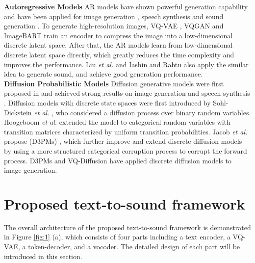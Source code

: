 \documentclass[lettersize,journal]{IEEEtran}
\begin{document}
 \noindent  \textbf{Autoregressive Models} AR models \cite{brown2020language,radford2018improving} have shown powerful generation capability and have been applied for image generation \cite{esser2021taming,ding2021cogview,van2017neural,parmar2018image,razavi2019generating,ramesh2021zero,AdityaRamesh2022HierarchicalTI}, speech synthesis \cite{wang2017tacotron} and sound generation \cite{liu2021conditional,iashin2021taming}. To generate high-resolution images, VQ-VAE \cite{van2017neural,razavi2019generating}, VQGAN \cite{esser2021taming} and ImageBART \cite{esser2021imagebart}
train an encoder to compress the image into a low-dimensional discrete latent space. After that, the AR models learn from low-dimensional discrete latent space directly, which greatly reduces the time complexity and improves the performance. Liu \textit{et al.} \cite{liu2021conditional} and Iashin and Rahtu \cite{iashin2021taming} also apply the similar idea to generate sound, and achieve good generation performance. \\
\noindent \textbf{Diffusion Probabilistic Models}
Diffusion generative models were first proposed in \cite{sohl2015deep} and achieved strong results on image generation \cite{dhariwal2021diffusion,gu2021vector,nichol2021glide,esser2021imagebart} and speech synthesis \cite{kong2020diffwave,jeong2021diff,popov2021grad,lee2021priorgrad}.
Diffusion models with discrete state spaces were first introduced by Sohl-Dickstein \textit{et al.} \cite{sohl2015deep}, who considered a diffusion process over binary random variables. Hoogeboom \textit{et al.} \cite{hoogeboom2021argmax} extended the model to categorical random variables with transition matrices characterized by uniform transition probabilities. Jacob \textit{et al.} propose {\color{black}{Discrete Denoising Diffusion Probabilistic Models}} (D3PMs) \cite{austin2021structured}, which further improve and extend discrete diffusion models by using a more structured categorical corruption process to corrupt the forward process. D3PMs \cite{austin2021structured} and VQ-Diffusion \cite{gu2021vector} have applied discrete diffusion models to image generation.


\section{Proposed text-to-sound framework} \label{AR sound generation model}
The overall architecture of the proposed text-to-sound framework is demonstrated in Figure \ref{fig:1} (a), which consists of four parts including a text encoder, a VQ-VAE, a token-decoder, and a vocoder. The detailed design of each part will be introduced in this section.
\end{document}
